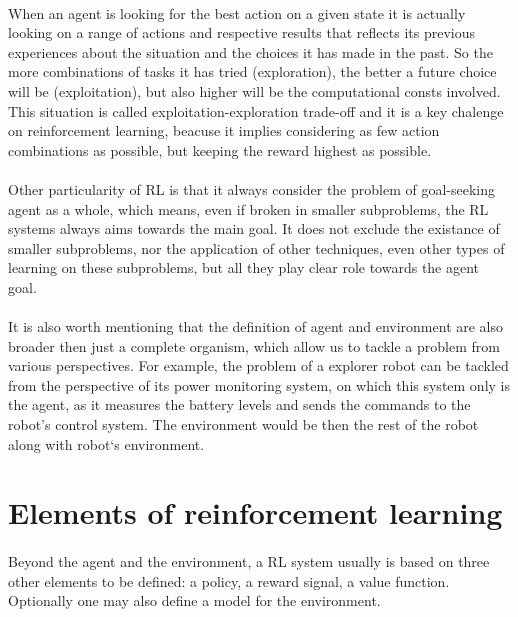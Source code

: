 \documentclass{article}
\begin{document}
\paragraph{}
When an agent is looking for the best action on a given state it is actually looking on a range of actions and respective results that reflects its previous experiences about the situation and the choices it has made in the past. So the more combinations of tasks it has tried (exploration), the better a future choice will be (exploitation), but also higher will be the computational consts involved. This situation is called exploitation-exploration trade-off and it is a key chalenge on reinforcement learning, beacuse it implies considering as few action combinations as possible, but keeping the reward highest as possible.

\paragraph{}
Other particularity of RL is that it always consider the problem of goal-seeking agent as a whole, which means, even if broken in smaller subproblems, the RL systems always aims towards the main goal. It does not exclude the existance of smaller subproblems, nor the application of other techniques, even other types of learning on these subproblems, but all they play clear role towards the agent goal.

\paragraph{}
It is also worth mentioning that the definition of agent and environment are also broader then just a complete organism, which allow us to tackle a problem from various perspectives. For example, the problem of a explorer robot can be tackled from the perspective of its power monitoring system, on which this system only is the agent, as it measures the battery levels and sends the commands to the robot's control system. The environment would be then the rest of the robot along with robot`s environment.

\section{Elements of reinforcement learning}
\paragraph{}
Beyond the agent and the environment, a RL system usually is based on three other elements to be defined: a policy, a reward signal, a value function. Optionally one may also define a model for the environment.
\end{document}

